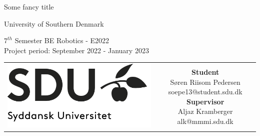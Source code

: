 \begin{titlepage}
	\begin{center}
		
		\null\vspace{2cm}
		
		{\huge
			Some fancy title
		}
	
		\vspace{1cm}
		
		{\Large
			University of Southern Denmark
		}
		
		\vspace{1cm}
		
		{\small
			$7^{th}$ Semester BE Robotics - E2022\\
			Project period: September 2022 - January 2023
		}
	
		\vfill
		
		\begin{tabular}{cc}
			\parbox{0.25\textwidth}{
				\includegraphics[width=0.25 \textwidth]{../resources/sdu-logo.png}
			}
			&
			\parbox{0.55\textwidth}{
				{\small
					\textbf{Student} \\
					Søren Riisom Pedersen \hfill soepe13@student.sdu.dk \\
					\textbf{Supervisor} \\
					Aljaz Kramberger \hfill alk@mmmi.sdu.dk \\
				}
			}
		\end{tabular}
	
	\end{center}
\end{titlepage}
